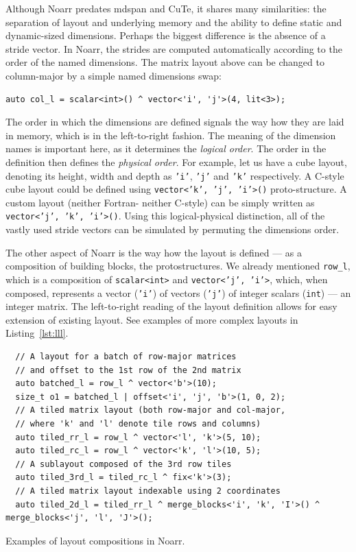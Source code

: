Although Noarr predates mdspan and CuTe, it shares many similarities: the separation of layout and underlying memory and the ability to define static and dynamic-sized dimensions. Perhaps the biggest difference is the absence of a stride vector. In Noarr, the strides are computed automatically according to the order of the named dimensions. The matrix layout above can be changed to column-major by a simple named dimensions swap:
\begin{verbatim}
auto col_l = scalar<int>() ^ vector<'i', 'j'>(4, lit<3>);
\end{verbatim}
The order in which the dimensions are defined signals the way how they are laid in memory, which is in the left-to-right fashion. The meaning of the dimension names is important here, as it determines the \emph{logical order}. The order in the definition then defines the \emph{physical order}. For example, let us have a cube layout, denoting its height, width and depth as \texttt{'i'}, \texttt{'j'} and \texttt{'k'} respectively. A C-style cube layout could be defined using \texttt{vector<'k', 'j', 'i'>()} proto-structure. A custom layout (neither Fortran- neither C-style) can be simply written as \texttt{vector<'j', 'k', 'i'>()}. Using this logical-physical distinction, all of the vastly used stride vectors can be simulated by permuting the dimensions order.

The other aspect of Noarr is the way how the layout is defined --- as a composition of building blocks, the protostructures. We already mentioned \texttt{row\_l}, which is a composition of \texttt{scalar<int>} and \texttt{vector<'j', 'i'>}, which, when composed, represents a vector (\texttt{'i'}) of vectors (\texttt{'j'}) of integer scalars (\texttt{int}) --- an integer matrix. The left-to-right reading of the layout definition allows for easy extension of existing layout. See examples of more complex layouts in Listing~\ref{lst:lll}.

\begin{listing}
  \begin{verbatim}
  // A layout for a batch of row-major matrices
  // and offset to the 1st row of the 2nd matrix
  auto batched_l = row_l ^ vector<'b'>(10);
  size_t o1 = batched_l | offset<'i', 'j', 'b'>(1, 0, 2);
  // A tiled matrix layout (both row-major and col-major, 
  // where 'k' and 'l' denote tile rows and columns)
  auto tiled_rr_l = row_l ^ vector<'l', 'k'>(5, 10);
  auto tiled_rc_l = row_l ^ vector<'k', 'l'>(10, 5);
  // A sublayout composed of the 3rd row tiles 
  auto tiled_3rd_l = tiled_rc_l ^ fix<'k'>(3);
  // A tiled matrix layout indexable using 2 coordinates
  auto tiled_2d_l = tiled_rr_l ^ merge_blocks<'i', 'k', 'I'>() ^ merge_blocks<'j', 'l', 'J'>();
  \end{verbatim}
  \caption{Examples of layout compositions in Noarr.}
  \label{lst:lll}
\end{listing}

